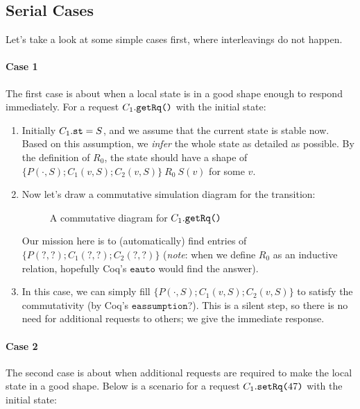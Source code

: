 \documentclass[format=manuscript]{acmart}
\begin{document}
\subsection{Serial Cases}\label{serial-cases}

Let's take a look at some simple cases first, where interleavings do not happen.

\paragraph{Case 1}
The first case is about when a local state is in a good shape enough to respond
immediately. For a request $C_1.\texttt{getRq()}$ with the initial state:

\begin{enumerate}
\item Initially $C_1.\texttt{st} = S$, and we assume that the current state is stable
  now. Based on this assumption, we \emph{infer} the whole state as detailed as
  possible. By the definition of $R_0$, the state should have a shape of $\{
  P(\cdot, S); C_1(v, S); C_2(v, S) \}\ R_0\ S(v)$ for some $v$.
\item Now let's draw a commutative simulation diagram for the transition:
  \begin{figure}[h]
    \caption{A commutative diagram for $C_1.\texttt{getRq()}$}
    \label{fig:comm-diagram-getrq}
  \end{figure}
  
  Our mission here is to (automatically) find entries of $\{ P(?, ?); C_1(?, ?);
  C_2(?, ?) \}$ (\emph{note}: when we define $R_0$ as an inductive relation,
  hopefully Coq's $\texttt{eauto}$ would find the answer).
\item In this case, we can simply fill $\{ P(\cdot, S); C_1(v, S); C_2(v, S) \}$
  to satisfy the commutativity (by Coq's $\texttt{eassumption}$?). This is a
  silent step, so there is no need for additional requests to others; we give
  the immediate response.
\end{enumerate}

\paragraph{Case 2}
The second case is about when additional requests are required to make the local
state in a good shape. Below is a scenario for a request $C_1.\texttt{setRq(}47\texttt{)}$
with the initial state:
\end{document}
